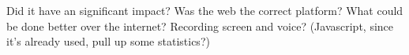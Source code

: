 Did it have an significant impact? Was the web the correct platform? What
could be done better over the internet? Recording screen and voice?
(Javascript, since it's already used, pull up some statistics?)
